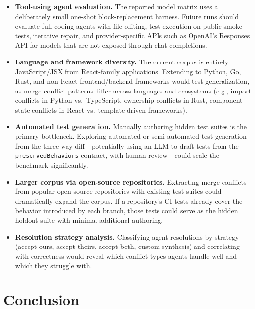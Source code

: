 \documentclass[11pt,letterpaper]{article}
\begin{document}
\begin{itemize}[leftmargin=2em]
\item \textbf{Tool-using agent evaluation.} The reported model matrix uses a deliberately small one-shot block-replacement harness. Future runs should evaluate full coding agents with file editing, test execution on public smoke tests, iterative repair, and provider-specific APIs such as OpenAI's Responses API for models that are not exposed through chat completions.

\item \textbf{Language and framework diversity.} The current corpus is entirely JavaScript/JSX from React-family applications. Extending to Python, Go, Rust, and non-React frontend/backend frameworks would test generalization, as merge conflict patterns differ across languages and ecosystems (e.g., import conflicts in Python vs.\ TypeScript, ownership conflicts in Rust, component-state conflicts in React vs.\ template-driven frameworks).

\item \textbf{Automated test generation.} Manually authoring hidden test suites is the primary bottleneck. Exploring automated or semi-automated test generation from the three-way diff---potentially using an LLM to draft tests from the \texttt{preservedBehaviors} contract, with human review---could scale the benchmark significantly.

\item \textbf{Larger corpus via open-source repositories.} Extracting merge conflicts from popular open-source repositories with existing test suites could dramatically expand the corpus. If a repository's CI tests already cover the behavior introduced by each branch, those tests could serve as the hidden holdout suite with minimal additional authoring.

\item \textbf{Resolution strategy analysis.} Classifying agent resolutions by strategy (accept-ours, accept-theirs, accept-both, custom synthesis) and correlating with correctness would reveal which conflict types agents handle well and which they struggle with.
\end{itemize}

\section{Conclusion}
\label{sec:conclusion}
\end{document}
